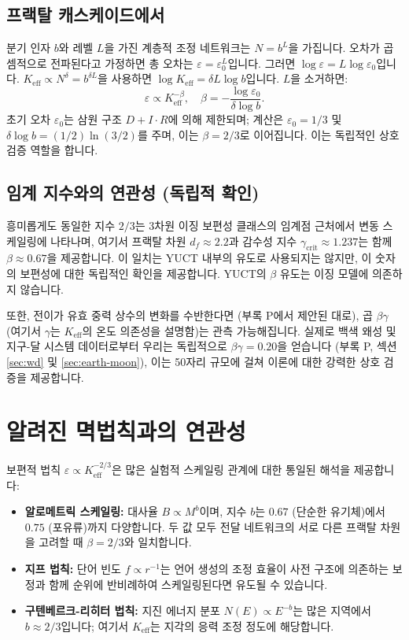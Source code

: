 \documentclass[11pt,a4paper]{article}
\newcommand{\Keff}{K_{\mathrm{eff}}}
\newcommand{\eps}{\varepsilon}
\begin{document}
	\subsection*{프랙탈 캐스케이드에서}
	분기 인자 \(b\)와 레벨 \(L\)을 가진 계층적 조정 네트워크는 \(N = b^L\)을 가집니다. 오차가 곱셈적으로 전파된다고 가정하면 총 오차는 \(\eps = \eps_0^{L}\)입니다. 그러면 \(\log \eps = L \log \eps_0\)입니다. \(\Keff \propto N^{\delta} = b^{\delta L}\)을 사용하면 \(\log \Keff = \delta L \log b\)입니다. \(L\)을 소거하면:
	\[
	\eps \propto \Keff^{-\beta}, \quad \beta = -\frac{\log \eps_0}{\delta \log b}.
	\]
	초기 오차 \(\eps_0\)는 삼원 구조 \(D+I\!\cdot\!R\)에 의해 제한되며; 계산은 \(\eps_0 = 1/3\) 및 \(\delta \log b = (1/2)\ln(3/2)\)를 주며, 이는 \(\beta = 2/3\)로 이어집니다. 이는 독립적인 상호 검증 역할을 합니다.
	
	\subsection*{임계 지수와의 연관성 (독립적 확인)}
	흥미롭게도 동일한 지수 \(2/3\)는 3차원 이징 보편성 클래스의 임계점 근처에서 변동 스케일링에 나타나며, 여기서 프랙탈 차원 \(d_f \approx 2.2\)과 감수성 지수 \(\gamma_{\mathrm{crit}} \approx 1.237\)는 함께 \(\beta \approx 0.67\)을 제공합니다. 이 일치는 YUCT 내부의 유도로 사용되지는 않지만, 이 숫자의 보편성에 대한 독립적인 확인을 제공합니다. YUCT의 \(\beta\) 유도는 이징 모델에 의존하지 않습니다.
	
	또한, 전이가 유효 중력 상수의 변화를 수반한다면 (부록 P에서 제안된 대로), 곱 \(\beta\gamma\) (여기서 \(\gamma\)는 \(K_{\mathrm{eff}}\)의 온도 의존성을 설명함)는 관측 가능해집니다. 실제로 백색 왜성 및 지구-달 시스템 데이터로부터 우리는 독립적으로 \(\beta\gamma = 0.20\)을 얻습니다 (부록 P, 섹션 \ref{sec:wd} 및 \ref{sec:earth-moon}), 이는 50자리 규모에 걸쳐 이론에 대한 강력한 상호 검증을 제공합니다.
	
	\section{알려진 멱법칙과의 연관성}
	\label{sec:connections}
	
	보편적 법칙 \(\eps \propto \Keff^{-2/3}\)은 많은 실험적 스케일링 관계에 대한 통일된 해석을 제공합니다:
	
	\begin{itemize}
		\item \textbf{알로메트릭 스케일링:} 대사율 \(B \propto M^{b}\)이며, 지수 \(b\)는 \(0.67\) (단순한 유기체)에서 \(0.75\) (포유류)까지 다양합니다. 두 값 모두 전달 네트워크의 서로 다른 프랙탈 차원을 고려할 때 \(\beta = 2/3\)와 일치합니다.
		\item \textbf{지프 법칙:} 단어 빈도 \(f \propto r^{-1}\)는 언어 생성의 조정 효율이 사전 구조에 의존하는 보정과 함께 순위에 반비례하여 스케일링된다면 유도될 수 있습니다.
		\item \textbf{구텐베르크-리히터 법칙:} 지진 에너지 분포 \(N(E) \propto E^{-b}\)는 많은 지역에서 \(b \approx 2/3\)입니다; 여기서 \(\Keff\)는 지각의 응력 조정 정도에 해당합니다.
	\end{itemize}
	
\end{document}
